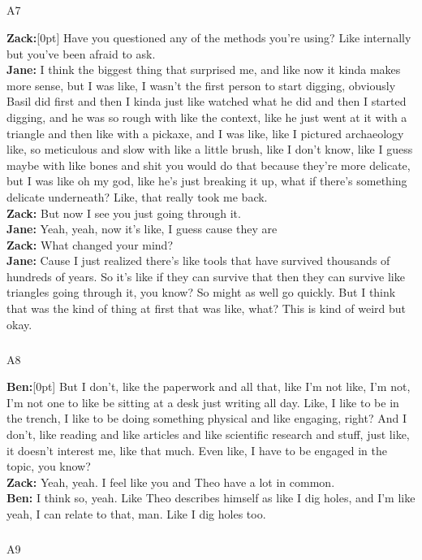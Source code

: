 \documentclass[
]{article}
\makeatletter
\let\oldsubparagraph\subparagraph
\renewcommand{\subparagraph}{
    \@ifstar
      \xxxSubParagraphStar
      \xxxSubParagraphNoStar
  }
\newcommand{\xxxSubParagraphStar}[1]{\oldsubparagraph*{#1}\mbox{}}
\newcommand{\xxxSubParagraphNoStar}[1]{\oldsubparagraph{#1}\mbox{}}
\newcommand{\paragraphnumber}[1]{\marginnote{\color{lightgray}\tiny{#1}}[0pt]}
\makeatother
\begin{document}
\subparagraph{A7}\label{sec-A7}

\textbf{Zack:}\paragraphnumber{[101]} Have you questioned any of the
methods you're using? Like internally but you've been afraid to ask.\\
\textbf{Jane:} I think the biggest thing that surprised me, and like now
it kinda makes more sense, but I was like, I wasn't the first person to
start digging, obviously Basil did first and then I kinda just like
watched what he did and then I started digging, and he was so rough with
like the context, like he just went at it with a triangle and then like
with a pickaxe, and I was like, like I pictured archaeology like, so
meticulous and slow with like a little brush, like I don't know, like I
guess maybe with like bones and shit you would do that because they're
more delicate, but I was like oh my god, like he's just breaking it up,
what if there's something delicate underneath? Like, that really took me
back.\\
\textbf{Zack:} But now I see you just going through it.\\
\textbf{Jane:} Yeah, yeah, now it's like, I guess cause they are\\
\textbf{Zack:} What changed your mind?\\
\textbf{Jane:} Cause I just realized there's like tools that have
survived thousands of hundreds of years. So it's like if they can
survive that then they can survive like triangles going through it, you
know? So might as well go quickly. But I think that was the kind of
thing at first that was like, what? This is kind of weird but okay.

\subparagraph{A8}\label{sec-A8}

\textbf{Ben:}\paragraphnumber{[102]} But I don't, like the paperwork and
all that, like I'm not like, I'm not, I'm not one to like be sitting at
a desk just writing all day. Like, I like to be in the trench, I like to
be doing something physical and like engaging, right? And I don't, like
reading and like articles and like scientific research and stuff, just
like, it doesn't interest me, like that much. Even like, I have to be
engaged in the topic, you know?\\
\textbf{Zack:} Yeah, yeah. I feel like you and Theo have a lot in
common.\\
\textbf{Ben:} I think so, yeah. Like Theo describes himself as like I
dig holes, and I'm like yeah, I can relate to that, man. Like I dig
holes too.

\subparagraph{A9}\label{sec-A9}
\end{document}

